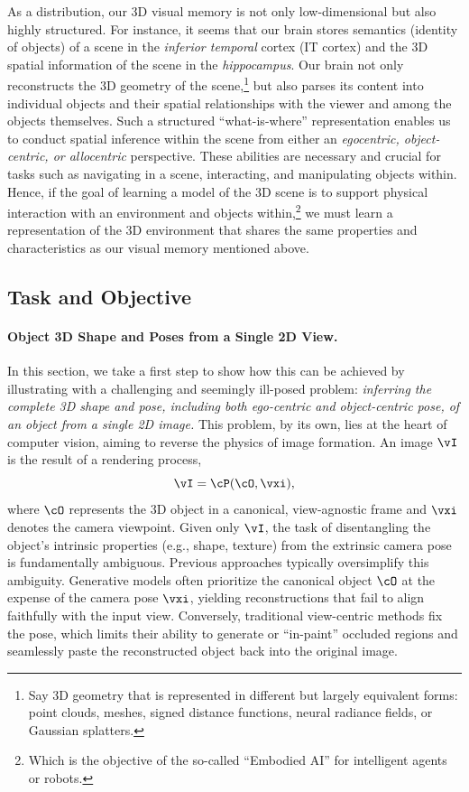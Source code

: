 \documentclass[../../book-main.tex]{subfiles}
\begin{document}
As a distribution, our 3D visual memory is not only low-dimensional but also highly structured.
For instance, it seems that our brain stores semantics (identity of objects) of a scene in the \textit{inferior temporal} cortex (IT cortex) and the 3D spatial information of the scene in the \textit{hippocampus}.
Our brain not only reconstructs the 3D geometry of the scene,\footnote{Say 3D geometry that is represented in different but largely equivalent forms: point clouds, meshes, signed distance functions, neural radiance fields, or Gaussian splatters.} but also parses its content into individual objects and their spatial relationships with the viewer and among the objects themselves.
Such a structured ``what-is-where'' representation enables us to conduct spatial inference within the scene from either an \textit{egocentric, object-centric, or allocentric} perspective.
These abilities are necessary and crucial for tasks such as navigating in a scene, interacting, and manipulating objects within.
Hence, if the goal of learning a model of the 3D scene is to support physical interaction with an environment and objects within,\footnote{Which is the objective of the so-called ``Embodied AI'' for intelligent agents or robots.} we must learn a representation of the 3D environment that shares the same properties and characteristics as our visual memory mentioned above.

\subsection{Task and Objective}
\label{sub:cupid_objective}

\paragraph{Object 3D Shape and Poses from a Single 2D View.}
In this section, we take a first step to show how this can be
achieved by illustrating with a challenging and seemingly ill-posed
problem: \textit{inferring the complete 3D shape and pose, including
both ego-centric and object-centric pose, of an object from a single
2D image.} This problem, by its own, lies at the heart of computer
vision, aiming to reverse the physics of image formation.
An image \(\image\) is the result of a rendering process,
\begin{equation}
\image = \render(\object, \pose) ,
\end{equation}
where \(\object\) represents the 3D object in a canonical,
view-agnostic frame and \(\pose\) denotes the camera viewpoint.
Given only \(\image\), the task of disentangling the object's intrinsic
properties (e.g., shape, texture) from the extrinsic camera pose is
fundamentally ambiguous.
Previous approaches typically oversimplify this ambiguity. Generative models often prioritize the canonical object \(\object\) at the expense of the camera pose \(\pose\), yielding reconstructions that fail to align faithfully with the input view.
Conversely, traditional view-centric methods fix the pose, which limits their ability to generate or ``in-paint'' occluded regions and seamlessly paste the reconstructed object back into the original image.
\end{document}
